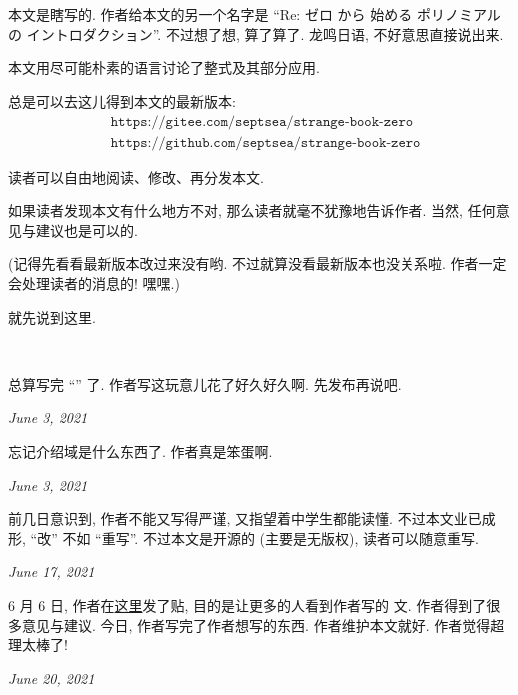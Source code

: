 \section*{\Preface}

本文是瞎写的. 作者给本文的另一个名字是 ``Re: ゼロ から 始める ポリノミアル の イントロダクション''. 不过想了想, 算了算了. 龙鸣日语, 不好意思直接说出来.

本文用尽可能朴素的语言讨论了整式及其部分应用.

总是可以去这{\scriptsize 儿}得到本文的最新版本:
\begin{align*}
     & \texttt{https://gitee.com/septsea/strange-book-zero}  \\
     & \texttt{https://github.com/septsea/strange-book-zero}
\end{align*}

读者可以自由地阅读、修改、再分发本文.

如果读者发现本文有什么地方不对, 那么读者就毫不犹豫地告诉作者. 当然, 任何意见与建议也是可以的.

(记得先看看最新版本改过来没有哟. 不过就算没看最新版本也没关系啦. 作者一定会处理读者的消息的! 嘿嘿.)

就先说到这里.

~\

\providecommand{\appendDate}{}
\renewcommand{\appendDate}[1]{\par \hfill {\itshape \sffamily #1}}

\begin{remark}
    总算写完 ``\Prerequisites'' 了. 作者写这玩意{\scriptsize 儿}花了好久好久啊. 先发布再说吧.
    \appendDate{June 3, 2021}
\end{remark}

\begin{remark}
    忘记介绍域是什么东西了. 作者真是笨蛋啊.
    \appendDate{June 3, 2021}
\end{remark}

\begin{remark}
    前几日意识到, 作者不能又写得严谨, 又指望着中学生都能读懂. 不过本文业已成形, ``改'' 不如 ``重写''. 不过本文是开源的 (主要是无版权), 读者可以随意重写.
    \appendDate{June 17, 2021}
\end{remark}

\begin{remark}
    6 月 6 日, 作者在\hyperref{https://chaoli.club/index.php/6396}{}{}{这里}发了贴, 目的是让更多的人看到作者写的  文. 作者得到了很多意见与建议. 今日, 作者写完了作者想写的东西. 作者维护本文就好. 作者觉得超理太棒了!
    \appendDate{June 20, 2021}
\end{remark}

